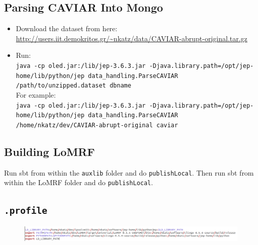 \documentclass[12pt]{article}
\begin{document}
\subsection*{Parsing CAVIAR Into Mongo}
\begin{itemize}
\item Download the dataset from here: \scriptsize
 \url{http://users.iit.demokritos.gr/~nkatz/data/CAVIAR-abrupt-original.tar.gz} \normalsize 
\item Run: \\
\scriptsize \texttt{java -cp oled.jar:/lib/jep-3.6.3.jar -Djava.library.path=/opt/jep-home/lib/python/jep data\_handling.ParseCAVIAR /path/to/unzipped.dataset dbname} \normalsize \\
For example: \\
\scriptsize \texttt{java -cp oled.jar:/lib/jep-3.6.3.jar -Djava.library.path=/opt/jep-home/lib/python/jep data\_handling.ParseCAVIAR /home/nkatz/dev/CAVIAR-abrupt-original caviar} \normalsize
\end{itemize}

\subsection*{Building LoMRF}
Run sbt from within the \texttt{auxlib} folder and do \texttt{publishLocal}. Then run sbt from within the LoMRF folder and do \texttt{publishLocal}.

\subsection*{\texttt{.profile}}
\begin{figure}[h]
\centering
\includegraphics[width=\textwidth]{./figures/profile-example.png}
\end{figure} 
\end{document}
